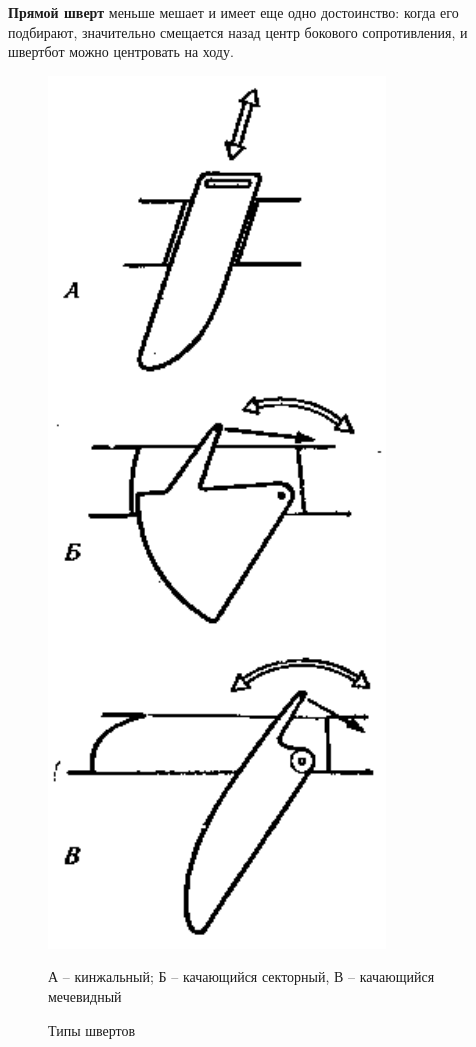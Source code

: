 \documentclass[a4paper, 12pt, twoside, final]{scrbook}
\begin{document}
\textbf{Прямой шверт} меньше мешает и имеет еще одно достоинство:
когда его подбирают, значительно смещается назад центр бокового сопротивления,
и швертбот можно центровать на ходу.

\begin{figure}%
\begin{centering}
\includegraphics{Tipy_shvertov}
\par\end{centering}

\protect\caption{\label{fig:33}Типы швертов}


\centering{}\small А \--- кинжальный; Б \--- качающийся секторный, В \--- качающийся мечевидный
\end{figure}
\end{document}
